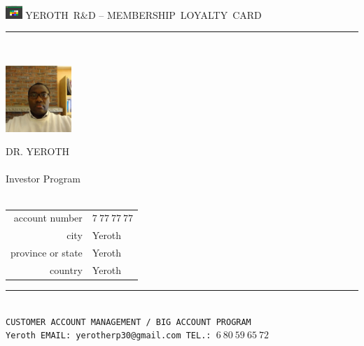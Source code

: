 \documentclass[11pt,a4paper]{memoir}
\begin{document}
    \begin{Spacing}{0.75}%
    \noindent
	\includegraphics[height=5mm]{../yeroth-erp-3-0-images/yeroth-erp-3-0-icon.png}
	{\tiny \emptyset \hfill \textcolor{yerothColorGold}{YEROTH~R\&D -- MEMBERSHIP~LOYALTY~CARD}}\\
    \vspace{-0.25em}
    \rule{74mm}{.3mm}\\
    \begin{minipage}[t]{33mm}
        \vspace{-0mm}%
        \includegraphics[height=25mm]{../doc/francais/images/XavierNOUNDOU-2}
    \end{minipage}
    \hspace{1mm}
    \begin{minipage}[t]{42mm}
        \vspace{-0mm}%
        \begin{flushleft}
        {\scriptsize
            \begin{Spacing}{1}%
            \textcolor{yerothColorGold}{DR. YEROTH}\\
            \hspace{5mm} \\
            \hspace{5mm} Investor Program \\
            \hspace{5mm} \vspace{2mm}\\
            \end{Spacing}
        }
        {\tiny
        	\begin{tabular}{rl}
            	{\color{gray}account number} & $7\ 77\ 77\ 77$\\
            	{\color{gray}city} & Yeroth\\
            	{\color{gray}province or state} & Yeroth\\
            	{\color{gray}country} & Yeroth\\
            \end{tabular}
            \vspace*{3mm}
        }
        \end{flushleft}
    \end{minipage}
    \rule{74mm}{0mm}\\
    \vspace{-0.45em}
    \hspace*{-0.4em}
    \texttt{\fontsize{1.83mm}{3.55mm}\selectfont CUSTOMER ACCOUNT MANAGEMENT~/~BIG ACCOUNT PROGRAM \\
    \hspace*{-0.54em}
    \texttt{\fontsize{1.83mm}{3.55mm}\selectfont Yeroth \bullet{} EMAIL: yerotherp30@gmail.com \bullet{} TEL.: $6\ 80\ 59\ 65\ 72$}}
    \end{Spacing}
\end{document}
